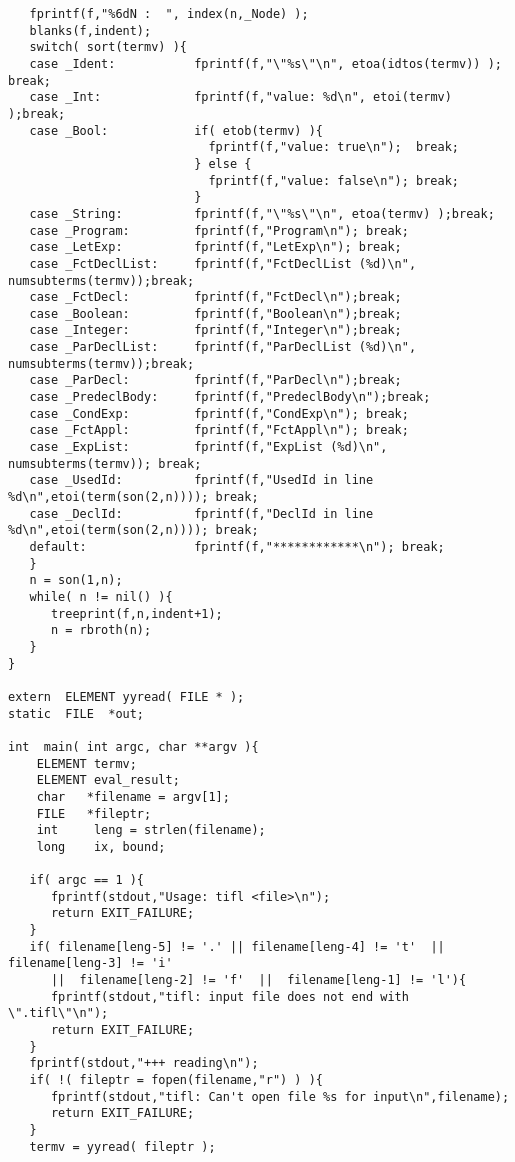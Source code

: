 \begin{verbatim}
   fprintf(f,"%6dN :  ", index(n,_Node) );
   blanks(f,indent);
   switch( sort(termv) ){
   case _Ident:           fprintf(f,"\"%s\"\n", etoa(idtos(termv)) ); break;
   case _Int:             fprintf(f,"value: %d\n", etoi(termv) );break;
   case _Bool:            if( etob(termv) ){
                            fprintf(f,"value: true\n");  break;
                          } else {
                            fprintf(f,"value: false\n"); break;
                          }
   case _String:          fprintf(f,"\"%s\"\n", etoa(termv) );break;
   case _Program:         fprintf(f,"Program\n"); break;
   case _LetExp:          fprintf(f,"LetExp\n"); break;
   case _FctDeclList:     fprintf(f,"FctDeclList (%d)\n", numsubterms(termv));break;
   case _FctDecl:         fprintf(f,"FctDecl\n");break;
   case _Boolean:         fprintf(f,"Boolean\n");break;
   case _Integer:         fprintf(f,"Integer\n");break;
   case _ParDeclList:     fprintf(f,"ParDeclList (%d)\n", numsubterms(termv));break;
   case _ParDecl:         fprintf(f,"ParDecl\n");break;
   case _PredeclBody:     fprintf(f,"PredeclBody\n");break;
   case _CondExp:         fprintf(f,"CondExp\n"); break;
   case _FctAppl:         fprintf(f,"FctAppl\n"); break;
   case _ExpList:         fprintf(f,"ExpList (%d)\n", numsubterms(termv)); break;
   case _UsedId:          fprintf(f,"UsedId in line %d\n",etoi(term(son(2,n)))); break;
   case _DeclId:          fprintf(f,"DeclId in line %d\n",etoi(term(son(2,n)))); break;
   default:               fprintf(f,"************\n"); break;
   }      
   n = son(1,n);
   while( n != nil() ){
      treeprint(f,n,indent+1);
      n = rbroth(n);
   }
}

extern  ELEMENT yyread( FILE * );
static  FILE  *out;

int  main( int argc, char **argv ){
    ELEMENT termv;
    ELEMENT eval_result;
    char   *filename = argv[1];
    FILE   *fileptr;
    int     leng = strlen(filename);
    long    ix, bound;
   
   if( argc == 1 ){
      fprintf(stdout,"Usage: tifl <file>\n");
      return EXIT_FAILURE;
   }
   if( filename[leng-5] != '.' || filename[leng-4] != 't'  ||  filename[leng-3] != 'i' 
      ||  filename[leng-2] != 'f'  ||  filename[leng-1] != 'l'){
      fprintf(stdout,"tifl: input file does not end with \".tifl\"\n");
      return EXIT_FAILURE;
   }
   fprintf(stdout,"+++ reading\n");
   if( !( fileptr = fopen(filename,"r") ) ){
      fprintf(stdout,"tifl: Can't open file %s for input\n",filename);
      return EXIT_FAILURE;
   }
   termv = yyread( fileptr );


\end{verbatim}
